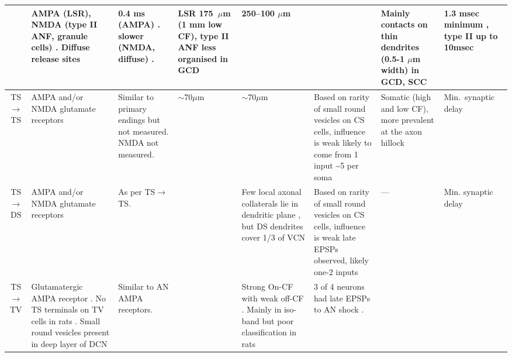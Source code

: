 \begin{longtable}{cYYYYYYY}
& %
AMPA (LSR), NMDA (type II ANF, granule cells)
\citep{Cant:1992,FerragamoGoldingEtAl:1998a,RyugoWrightEtAl:1993,Ryugo:1992,RyugoParks:2003}.
Diffuse release sites \citep{HurdHutsonEtAl:1999}             
& %
0.4 ms (AMPA)   \citep{GardnerTrussellEtAl:1999}. 
slower (NMDA, diffuse) \citep{HurdHutsonEtAl:1999}.    
& %
LSR 175~$\mu$m (1 mm low CF)\citep{Ryugo:2008}, type II ANF less organised in GCD \citep{WeedmanPongstapornEtAl:1996,RyugoWrigthEtAl:1993}
& %
250--100 $\mu$m \citep{FerragamoGoldingEtAl:1998a}                     
&                                            
& %
Mainly contacts on thin dendrites (0.5-1 $\mu$m width) in GCD, SCC 
\citep{BensonBrown:2004,FerragamoGoldingEtAl:1998}                
& %
1.3 msec minimum \citep{FerragamoGoldingEtAl:1998a}, 
type II up to 10msec \citep[theoretical][]{Brown:1993}
\\ \midrule
TS\ensuremath{\rightarrow}TS                        
& %
AMPA and/or NMDA glutamate receptors \citep{FerragamoGoldingEtAl:1998a}        
& %
Similar to primary endings but not measured.  
NMDA not measured.           
&
$\sim$70$\mu$m \citep[cat][]{SmithRhode:1989} 
& %
$\sim$70$\mu$m \citep[cat][]{SmithRhode:1989} 
& %
Based on rarity of small round vesicles on CS cells, influence is weak \citep{SmithRhode:1989} 
likely to come from 1 input \citep{FerragamoGoldingEtAl:1998a}                     
\~{}5 per soma  \citep[chinchilla][]{JosephsonMorest:1998}
& %
Somatic (high and low CF), more prevalent at the axon hillock   \citep[chinchilla][]{JosephsonMorest:1998}
& %
Min.\ synaptic delay 
\\ \midrule
TS\ensuremath{\rightarrow}DS                        
& %
AMPA and/or NMDA glutamate receptors \citep{FerragamoGoldingEtAl:1998a}  
& As per TS\ensuremath{\rightarrow}TS.
& %
& %
Few local axonal collaterals lie in dendritic plane \citep{SmithRhode:1989}, but DS dendrites cover 1/3 of VCN
& 
Based on rarity of small round vesicles on CS cells, influence is weak \citep{SmithRhode:1989} late EPSPs observed,
likely one-2 inputs \citep{FerragamoGoldingEtAl:1998a, OertelWuEtAl:1990} 
& ---                                     
& Min. synaptic delay \\ \midrule
TS\ensuremath{\rightarrow}TV                        
& %
Glutamatergic AMPA receptor  \citep{DoucetRossEtAl:1999,FerragamoGoldingEtAl:1998a,ZhangOertel:1993}.
No TS terminals on TV cells in rats \citep[rat][]{RubioJuiz:2004}.
Small round vesicles present in deep layer of DCN \citep[guinea pig][]{Alibardi:1999}
& 
Similar to AN AMPA receptors.        
& %
& %
Strong On-CF with weak off-CF  \citep[See fig 13][]{OstapoffBensonEtAl:1999}. 
Mainly in iso-band but poor classification in rats \citep{DoucetRossEtAl:1999,FriedlandPongstapornEtAl:2003}         
& %
3 of 4 neurons had late EPSPs to AN shock \citep[very young mice][]{ZhangOertel:1993}.
\citep{OstapoffMorestEtAl:1999} 


\end{longtable}
